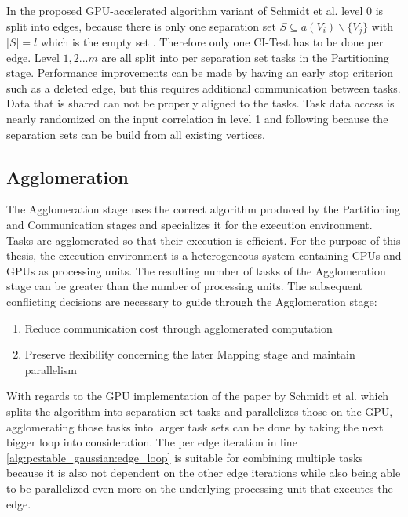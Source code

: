 In the proposed GPU-accelerated algorithm variant of Schmidt et al. \cite{schmidtOrderIndependentConstraintBasedCausal2018} level 0 is split into edges, because there is only one separation set $S \subseteq a(V_i ) \backslash \{V_j\}$ with $| S | = l$ which is the empty set ${}$. Therefore only one CI-Test has to be done per edge.
Level $1,2 ... m$ are all split into per separation set tasks in the Partitioning stage. Performance improvements can be made by having an early stop criterion such as a deleted edge, but this requires additional communication between tasks. Data that is shared can not be properly aligned to the tasks. Task data access is nearly randomized on the input correlation in level 1 and following because the separation sets can be build from all existing vertices. 

    
\subsection{Agglomeration}
The Agglomeration stage uses the correct algorithm produced by the Partitioning and Communication stages and specializes it for the execution environment. Tasks are agglomerated so that their execution is efficient. For the purpose of this thesis, the execution environment is a heterogeneous system containing CPUs and GPUs as processing units. The resulting number of tasks of the Agglomeration stage can be greater than the number of processing units. The subsequent conflicting decisions are necessary to guide through the Agglomeration stage:

\begin{enumerate}
    \item Reduce communication cost through agglomerated computation
    \item Preserve flexibility concerning the later Mapping stage and maintain parallelism
\end{enumerate}

With regards to the GPU implementation of the paper by Schmidt et al. \cite{schmidtOrderIndependentConstraintBasedCausal2018} which splits the algorithm into separation set tasks and parallelizes those on the GPU, agglomerating those tasks into larger task sets can be done by 
taking the next bigger loop into consideration. The per edge iteration in line \ref{alg:pcstable_gaussian:edge_loop} is suitable for combining multiple tasks because it is also not dependent on the other edge iterations while also being able to be parallelized even more on the underlying processing unit that executes the edge.

